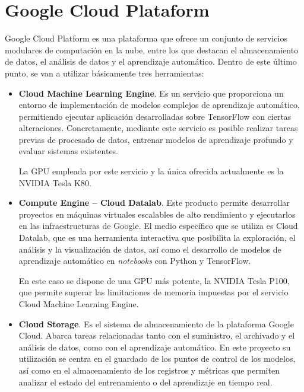 \section{Google Cloud Plataform}

Google Cloud Platform es una plataforma que ofrece un conjunto de servicios modulares de computación en la nube, entre los que destacan el almacenamiento de datos, el análisis de datos y el aprendizaje automático. Dentro de este último punto, se van a utilizar básicamente tres herramientas: \begin{itemize}
  \item \textbf{Cloud Machine Learning Engine}. Es un servicio que proporciona un entorno de implementación de modelos complejos de aprendizaje automático, permitiendo ejecutar aplicación desarrolladas sobre TensorFlow con ciertas alteraciones. Concretamente, mediante este servicio es posible realizar tareas previas de procesado de datos, entrenar modelos de aprendizaje profundo y evaluar sistemas existentes.
  
  La GPU empleada por este servicio y la única ofrecida actualmente es la NVIDIA Tesla K80.
  \item \textbf{Compute Engine -- Cloud Datalab}. Este producto permite desarrollar proyectos en máquinas virtuales escalables de alto rendimiento y ejecutarlos en las infraestructuras de Google. El medio específico que se utiliza es Cloud Datalab, que es una herramienta interactiva que posibilita la exploración, el análisis y la visualización de datos, así como el desarrollo de modelos de aprendizaje automático en \textit{notebooks} con Python y TensorFlow.
  
  En este caso se dispone de una GPU más potente, la NVIDIA Tesla P100, que permite superar las limitaciones de memoria impuestas por el servicio Cloud Machine Learning Engine.
  \item \textbf{Cloud Storage}. Es el sistema de almacenamiento de la plataforma Google Cloud. Abarca tareas relacionadas tanto con el suministro, el archivado y el análisis de datos, como con el aprendizaje automático. En este proyecto su utilización se centra en el guardado de los puntos de control de los modelos, así como en el almacenamiento de los registros y métricas que permiten analizar el estado del entrenamiento o del aprendizaje en tiempo real. 
\end{itemize}

